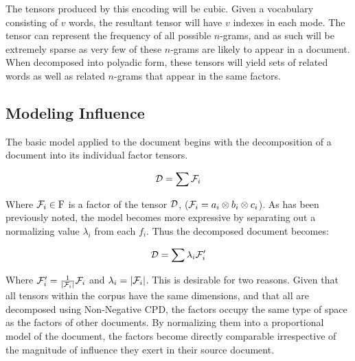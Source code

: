 \documentclass[../dissertation.tex]{subfiles}
\begin{document}
The tensors produced by this encoding will be cubic.  Given a
vocabulary consisting of $v$ words, the resultant tensor will have $v$
indexes in each mode.  The tensor can represent the frequency of all
possible $n$-grams, and as such will be extremely sparse as very few
of these $n$-grams are likely to appear in a document.  When
decomposed into polyadic form, these tensors will yield sets of
related words as well as related $n$-grams that appear in the same
factors.  



\subsection{Modeling Influence}
The basic model applied to the document begins with the decomposition
of a document into its individual factor tensors.

\begin{equation} \label{eq:document_decomposition}
  \mathcal{D} = \sum \mathcal{F}_i 
\end{equation}

Where $\mathcal{F}_i\in \mathrm{F}$ is a factor of the tensor $\mathcal{D}$,
($\mathcal{F}_i=a_i \otimes b_i \otimes c_i$).  As has been previously
noted, the model becomes more expressive by separating out a
normalizing value $\lambda_i$ from each $f_i$.  Thus the decomposed
document becomes:

\begin{equation} \label{eq:document_decomposition_normal}
  \mathcal{D} = \sum \lambda_i \mathcal{F}'_i
\end{equation}

Where $\mathcal{F}'_i=\frac{1}{|\mathcal{F}_i|} \mathcal{F}_i$ and
$\lambda_i = |\mathcal{F}_i|$.  This is desirable for two reasons.  Given
that all tensors within the corpus have the same dimensions, and that
all are decomposed using Non-Negative CPD, the factors occupy the same
type of space as the factors of other documents.  By normalizing them
into a proportional model of the document, the factors become directly
comparable irrespective of the magnitude of influence they exert in
their source document.
\end{document}
